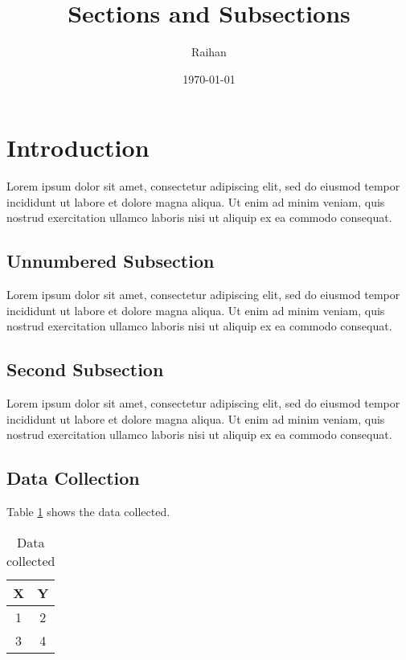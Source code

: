 \documentclass[a4paper, 12pt]{article}
\title{Sections and Subsections}
\author{Raihan}
\date{\today}
\begin{document}
\maketitle

\newpage

\tableofcontents

\newpage

\listoftables

\newpage

\newcommand\shortlorem{Lorem ipsum dolor sit amet, consectetur adipiscing elit, sed do eiusmod tempor incididunt ut labore et dolore magna aliqua. Ut enim ad minim veniam, quis nostrud exercitation ullamco laboris nisi ut aliquip ex ea commodo consequat. }

\section{Introduction}
\hspace{0.7em}\shortlorem

\subsection*{Unnumbered Subsection}
\shortlorem

\subsection{Second Subsection}
\shortlorem

\subsection{Data Collection}

\hspace{1.3em}Table \ref{tab:data} shows the data collected.

\begin{table}[h]
\centering
\begin{tabular}{|c|c|}
\hline
X & Y \\
\hline
1 & 2 \\
3 & 4 \\
\hline
\end{tabular}
\caption{Data collected}
\label{tab:data}
\end{table}
\end{document}
